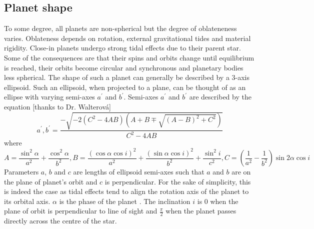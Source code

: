 \documentclass[10pt]{article}
\numberwithin{equation}{subsection}
\begin{document}
\subsection{Planet shape}
To some degree, all planets are non-spherical but the degree of oblateneness varies.
Oblateness depends on rotation, external gravitational tides and material rigidity. \cite{carter}
Close-in planets undergo strong tidal effects due to their parent star. Some of the 
consequences are that their spins and orbits change until equilibrium is reached, their
orbits become circular and synchronous and planetary bodies less spherical. \cite{correia1}
The shape of such a planet can generally be described by a 3-axis ellipsoid.
Such an ellipsoid, when projected to a plane, can be thought of as an ellipse with varying
semi-axes $a^{\prime}$ and $b^{\prime}$. Semi-axes $a^{\prime}$ and $b^{\prime}$ 
are described by the equation \cite{correia1} [thanks to Dr. Walterová]
\begin{equation}
  a^{\prime}, b^{\prime} = \frac{-\sqrt{-2(C^2 - 4AB)\left(A + B \mp\sqrt{(A -B)^2 + C^2}\right)}}{C^2 - 4AB}
  \label{eq:semi-axes}
\end{equation}
where 
\begin{equation}
  A = \frac{\sin^2\alpha}{a^2}+\frac{\cos^2\alpha}{b^2}, B = \frac{(\cos\alpha\cos i)^2}{a^2} + \frac{(\sin\alpha\cos i)^2}{b^2} + \frac{\sin^2 i}{c^2}, C = \left(\frac{1}{a^2} - \frac{1}{b^2}\right)\sin 2\alpha\cos i
  \label{eq:ABC}
\end{equation}
Parameters $a$, $b$ and $c$ are lengths of ellipsoid semi-axes such that $a$ and $b$
are on the plane of planet's orbit and $c$ is perpendicular. For the sake of simplicity,
this is indeed the case as tidal effects tend to align the rotation axis of the planet to
its orbital axis.
$\alpha$ is the phase of the planet . The inclination $i$ is 0 when the plane of orbit is perpendicular to line of sight
and $\frac{\pi}{2}$ when the planet passes directly across the centre of the star.
\end{document}
